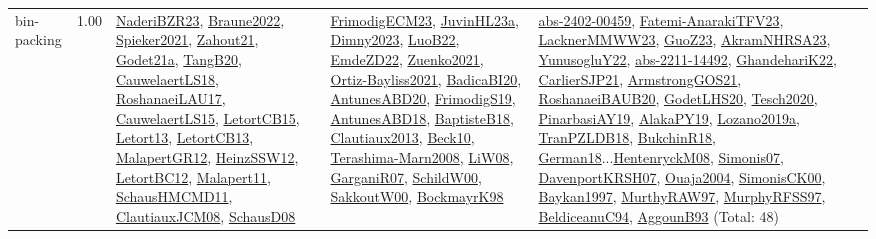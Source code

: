 {\begin{longtable}{p{3cm}r>{\raggedright\arraybackslash}p{6cm}>{\raggedright\arraybackslash}p{6cm}>{\raggedright\arraybackslash}p{8cm}}
\index{bin-packing}\index{Constraints!bin-packing}bin-packing &  1.00 & \hyperref[detail:NaderiBZR23]{NaderiBZR23}, \hyperref[detail:Braune2022]{Braune2022}, \hyperref[detail:Spieker2021]{Spieker2021}, \hyperref[detail:Zahout21]{Zahout21}, \hyperref[detail:Godet21a]{Godet21a}, \hyperref[detail:TangB20]{TangB20}, \hyperref[detail:CauwelaertLS18]{CauwelaertLS18}, \hyperref[detail:RoshanaeiLAU17]{RoshanaeiLAU17}, \hyperref[detail:CauwelaertLS15]{CauwelaertLS15}, \hyperref[detail:LetortCB15]{LetortCB15}, \hyperref[detail:Letort13]{Letort13}, \hyperref[detail:LetortCB13]{LetortCB13}, \hyperref[detail:MalapertGR12]{MalapertGR12}, \hyperref[detail:HeinzSSW12]{HeinzSSW12}, \hyperref[detail:LetortBC12]{LetortBC12}, \hyperref[detail:Malapert11]{Malapert11}, \hyperref[detail:SchausHMCMD11]{SchausHMCMD11}, \hyperref[detail:ClautiauxJCM08]{ClautiauxJCM08}, \hyperref[detail:SchausD08]{SchausD08} & \hyperref[detail:FrimodigECM23]{FrimodigECM23}, \hyperref[detail:JuvinHL23a]{JuvinHL23a}, \hyperref[detail:Dimny2023]{Dimny2023}, \hyperref[detail:LuoB22]{LuoB22}, \hyperref[detail:EmdeZD22]{EmdeZD22}, \hyperref[detail:Zuenko2021]{Zuenko2021}, \hyperref[detail:Ortiz-Bayliss2021]{Ortiz-Bayliss2021}, \hyperref[detail:BadicaBI20]{BadicaBI20}, \hyperref[detail:AntunesABD20]{AntunesABD20}, \hyperref[detail:FrimodigS19]{FrimodigS19}, \hyperref[detail:AntunesABD18]{AntunesABD18}, \hyperref[detail:BaptisteB18]{BaptisteB18}, \hyperref[detail:Clautiaux2013]{Clautiaux2013}, \hyperref[detail:Beck10]{Beck10}, \hyperref[detail:Terashima-Marn2008]{Terashima-Marn2008}, \hyperref[detail:LiW08]{LiW08}, \hyperref[detail:GarganiR07]{GarganiR07}, \hyperref[detail:SchildW00]{SchildW00}, \hyperref[detail:SakkoutW00]{SakkoutW00}, \hyperref[detail:BockmayrK98]{BockmayrK98} & \hyperref[detail:abs-2402-00459]{abs-2402-00459}, \hyperref[detail:Fatemi-AnarakiTFV23]{Fatemi-AnarakiTFV23}, \hyperref[detail:LacknerMMWW23]{LacknerMMWW23}, \hyperref[detail:GuoZ23]{GuoZ23}, \hyperref[detail:AkramNHRSA23]{AkramNHRSA23}, \hyperref[detail:YunusogluY22]{YunusogluY22}, \hyperref[detail:abs-2211-14492]{abs-2211-14492}, \hyperref[detail:GhandehariK22]{GhandehariK22}, \hyperref[detail:CarlierSJP21]{CarlierSJP21}, \hyperref[detail:ArmstrongGOS21]{ArmstrongGOS21}, \hyperref[detail:RoshanaeiBAUB20]{RoshanaeiBAUB20}, \hyperref[detail:GodetLHS20]{GodetLHS20}, \hyperref[detail:Tesch2020]{Tesch2020}, \hyperref[detail:PinarbasiAY19]{PinarbasiAY19}, \hyperref[detail:AlakaPY19]{AlakaPY19}, \hyperref[detail:Lozano2019a]{Lozano2019a}, \hyperref[detail:TranPZLDB18]{TranPZLDB18}, \hyperref[detail:BukchinR18]{BukchinR18}, \hyperref[detail:German18]{German18}...\hyperref[detail:HentenryckM08]{HentenryckM08}, \hyperref[detail:Simonis07]{Simonis07}, \hyperref[detail:DavenportKRSH07]{DavenportKRSH07}, \hyperref[detail:Ouaja2004]{Ouaja2004}, \hyperref[detail:SimonisCK00]{SimonisCK00}, \hyperref[detail:Baykan1997]{Baykan1997}, \hyperref[detail:MurthyRAW97]{MurthyRAW97}, \hyperref[detail:MurphyRFSS97]{MurphyRFSS97}, \hyperref[detail:BeldiceanuC94]{BeldiceanuC94}, \hyperref[detail:AggounB93]{AggounB93} (Total: 48)\\

\end{longtable}}
